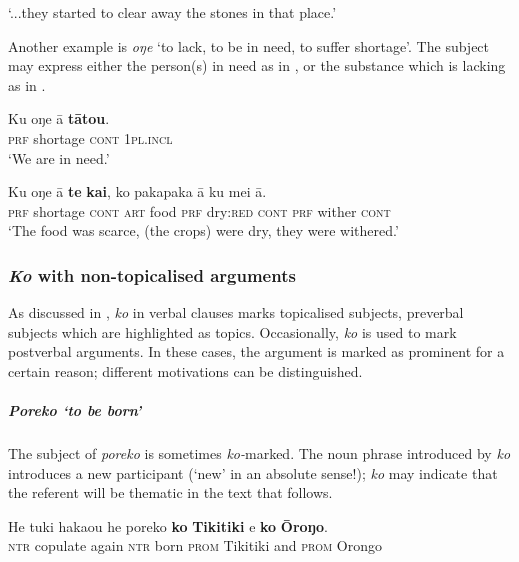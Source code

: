 \glt 
‘...they started to clear away the stones in that place.’ \textstyleExampleref{[R539-2.213]}
\z

Another example is \textit{oŋe} ‘to lack, to be in need, to suffer shortage’. The subject may express either the person(s) in need as in , or the substance which is lacking as in .

\ea\label{ex:8.143}
\gll Ku oŋe {\ꞌ}ā \textbf{tātou}. \\
\textsc{prf} shortage \textsc{cont} \textsc{1pl.incl} \\

\glt 
‘We are in need.’ \textstyleExampleref{[R352.118]}
\z

\ea\label{ex:8.144}
\gll Ku oŋe {\ꞌ}ā \textbf{te} \textbf{kai}, ko pakapaka {\ꞌ}ā ku mei {\ꞌ}ā. \\
\textsc{prf} shortage \textsc{cont} \textsc{art} food \textsc{prf} dry:\textsc{red} \textsc{cont} \textsc{prf} wither \textsc{cont} \\

\glt 
‘The food was scarce, (the crops) were dry, they were withered.’ \textstyleExampleref{[R352.112]} 
\z

\subsubsection{\textit{Ko} with non-topicalised arguments}\label{sec:8.6.4.5}
As discussed in , \textit{ko} in verbal clauses marks topicalised subjects, preverbal subjects which are highlighted as topics. Occasionally, \textit{ko} is used to mark postverbal arguments. In these cases, the argument is marked as prominent for a certain reason; different motivations can be distinguished.

\subparagraph{\textit{Poreko} ‘to be born’} The subject of \textit{poreko} is sometimes \textit{ko-}marked. The noun phrase introduced by \textit{ko} introduces a new participant (‘new’ in an absolute sense!); \textit{ko} may indicate that the referent will be thematic in the text that follows.

\ea\label{ex:8.145}
\gll He tuki haka{\ꞌ}ou he poreko \textbf{ko} \textbf{Tikitiki} {\ꞌ}e \textbf{ko} \textbf{{\ꞌ}Ōroŋo}. \\
\textsc{ntr} copulate again \textsc{ntr} born \textsc{prom} Tikitiki and \textsc{prom} Orongo \\

